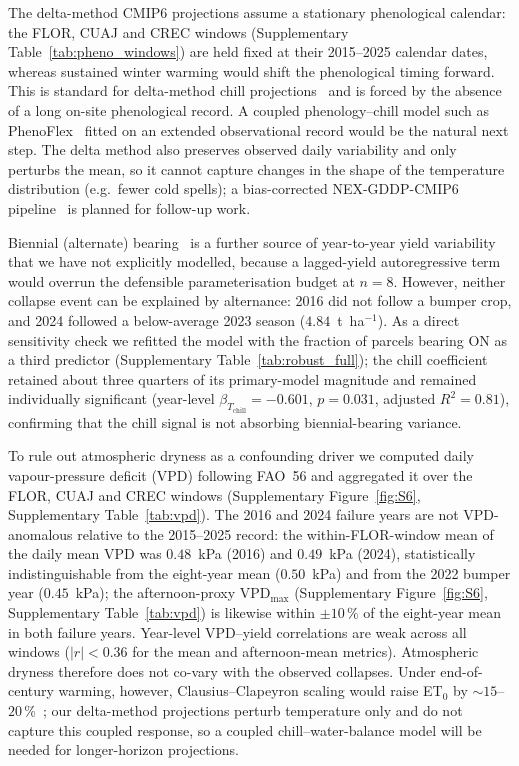 \documentclass[agronomy,article,submit,pdftex,moreauthors]{Definitions/mdpi}
\begin{document}
The delta-method CMIP6 projections assume a stationary phenological calendar: the FLOR, CUAJ and CREC windows (Supplementary Table~\ref{tab:pheno_windows}) are held fixed at their 2015--2025 calendar dates, whereas sustained winter warming would shift the phenological timing forward. This is standard for delta-method chill projections~\cite{luedeling2012,hannah2013} and is forced by the absence of a long on-site phenological record. A coupled phenology--chill model such as PhenoFlex~\cite{luedeling2021phenoflex} fitted on an extended observational record would be the natural next step. The delta method also preserves observed daily variability and only perturbs the mean, so it cannot capture changes in the shape of the temperature distribution (e.g.\ fewer cold spells); a bias-corrected NEX-GDDP-CMIP6 pipeline~\cite{thrasher2022} is planned for follow-up work.

Biennial (alternate) bearing~\cite{rallo2013,campbell2024biennial} is a further source of year-to-year yield variability that we have not explicitly modelled, because a lagged-yield autoregressive term would overrun the defensible parameterisation budget at $n=8$. However, neither collapse event can be explained by alternance: 2016 did not follow a bumper crop, and 2024 followed a below-average 2023 season ($4.84$~t~ha$^{-1}$). As a direct sensitivity check we refitted the model with the fraction of parcels bearing ON as a third predictor (Supplementary Table~\ref{tab:robust_full}); the chill coefficient retained about three quarters of its primary-model magnitude and remained individually significant (year-level $\beta_{T_{\text{chill}}}=-0.601$, $p=0.031$, adjusted $R^{2}=0.81$), confirming that the chill signal is not absorbing biennial-bearing variance.

To rule out atmospheric dryness as a confounding driver we computed daily vapour-pressure deficit (VPD) following FAO~56 and aggregated it over the FLOR, CUAJ and CREC windows (Supplementary Figure~\ref{fig:S6}, Supplementary Table~\ref{tab:vpd}). The 2016 and 2024 failure years are not VPD-anomalous relative to the 2015--2025 record: the within-FLOR-window mean of the daily mean VPD was $0.48$~kPa (2016) and $0.49$~kPa (2024), statistically indistinguishable from the eight-year mean ($0.50$~kPa) and from the 2022 bumper year ($0.45$~kPa); the afternoon-proxy VPD$_{\max}$ (Supplementary Figure~\ref{fig:S6}, Supplementary Table~\ref{tab:vpd}) is likewise within ${\pm}10\,\%$ of the eight-year mean in both failure years. Year-level VPD--yield correlations are weak across all windows ($|r|<0.36$ for the mean and afternoon-mean metrics). Atmospheric dryness therefore does not co-vary with the observed collapses. Under end-of-century warming, however, Clausius--Clapeyron scaling would raise ET$_{0}$ by ${\sim}15$--$20\,\%$~\cite{scheff2014scaling}; our delta-method projections perturb temperature only and do not capture this coupled response, so a coupled chill--water-balance model will be needed for longer-horizon projections.
\end{document}
